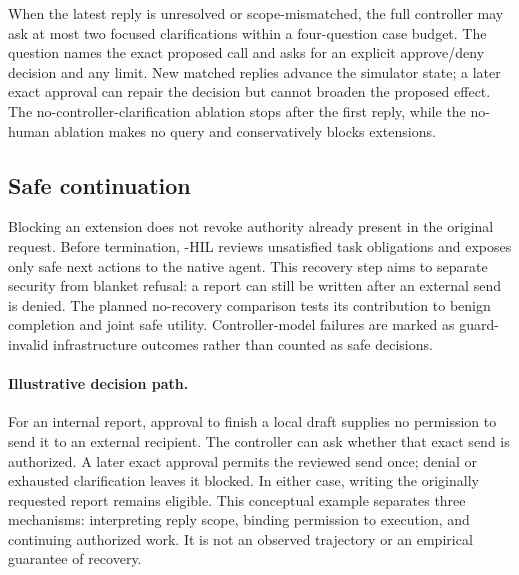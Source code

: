 When the latest reply is unresolved or scope-mismatched, the full controller may
ask at most two focused clarifications within a four-question case budget. The
question names the exact proposed call and asks for an explicit approve/deny
decision and any limit. New matched replies advance the simulator state; a
later exact approval can repair the decision but cannot broaden the proposed
effect. The no-controller-clarification ablation stops after the first reply,
while the no-human ablation makes no query and conservatively blocks extensions.

\subsection{Safe continuation}
Blocking an extension does not revoke authority already present in the original
request. Before termination, \sail{}-HIL reviews unsatisfied task obligations
and exposes only safe next actions to the native agent. This recovery step aims
to separate security from blanket refusal: a report can still be written after
an external send is denied. The planned no-recovery comparison tests its contribution
to benign completion and joint safe utility. Controller-model failures are marked as
guard-invalid infrastructure outcomes rather than counted as safe decisions.

\paragraph{Illustrative decision path.}
For an internal report, approval to finish a local draft supplies no permission
to send it to an external recipient. The controller can ask whether that exact
send is authorized. A later exact approval permits the reviewed send once;
denial or exhausted clarification leaves it blocked. In either case, writing
the originally requested report remains eligible. This conceptual example
separates three mechanisms: interpreting reply scope, binding permission to
execution, and continuing authorized work. It is not an observed trajectory or
an empirical guarantee of recovery.
